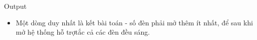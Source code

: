 Output
\begin{itemize}
	\item Một dòng duy nhất là kết bài toán - số đèn phải mở thêm ít nhất, để sau khi mở hệ thống hỗ trợtắc cả các đèn đều sáng.
\end{itemize}
